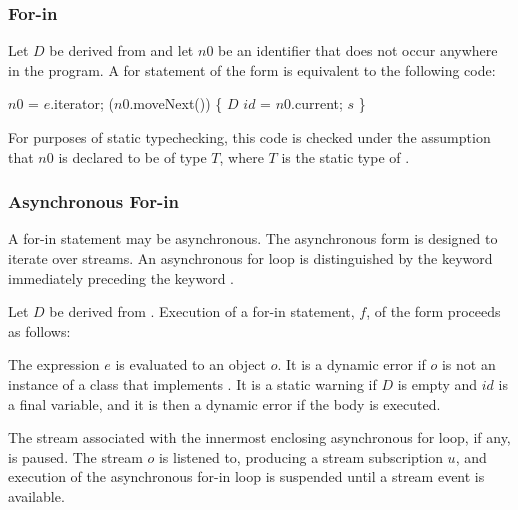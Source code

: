 \documentclass{article}
\begin{document}
\subsubsection{For-in}

\LMHash{}
Let $D$ be derived from 
and let $n0$ be an identifier that does not occur anywhere in the program.
A for statement of the form  is equivalent to the following code:

\begin{dartCode}
\VAR{} $n0$ = $e$.iterator;
\WHILE{} ($n0$.moveNext()) \{
   $D$ $id$ = $n0$.current;
   $s$
\}
\end{dartCode}

For purposes of static typechecking,
this code is checked under the assumption that $n0$ is declared to be of type $T$,
where $T$ is the static type of .



\subsubsection{Asynchronous For-in}

\LMHash{}
A for-in statement may be asynchronous.
The asynchronous form is designed to iterate over streams.
An asynchronous for loop is distinguished by the keyword \AWAIT{} immediately preceding the keyword \FOR.

\LMHash{}
Let $D$ be derived from .
Execution of a for-in statement, $f$, of the form
proceeds as follows:

\LMHash{}
The expression $e$ is evaluated to an object $o$.
It is a dynamic error if $o$ is not an instance of a class that implements .
It is a static warning if $D$ is empty and $id$ is a final variable,
and it is then a dynamic error if the body is executed.

\LMHash{}
The stream associated with the innermost enclosing asynchronous for loop, if any, is paused.
The stream $o$ is listened to, producing a stream subscription $u$,
and execution of the asynchronous for-in loop is suspended
until a stream event is available.
\end{document}
